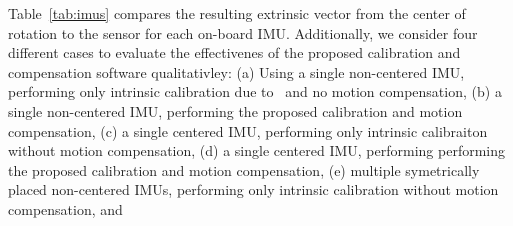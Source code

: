 \documentclass[journal]{IEEEtran}
\begin{document}
\begin{table}[]
  \caption{Comparison of IMU positions obtained from the CAD model and the proposed calibration.}\label{tab:imus}
  \centering
\end{table}
Table~\ref{tab:imus} compares the resulting extrinsic vector from the center of rotation to the sensor for each on-board IMU.
Additionally, we consider four different cases to evaluate the effectivenes of the proposed calibration and compensation software qualitativley:
(a) Using a single non-centered IMU, performing only intrinsic calibration due to~\cite{imutk2014} and no motion compensation, 
(b) a single non-centered IMU, performing the proposed calibration and motion compensation, 
(c) a single centered IMU, performing only intrinsic calibraiton without motion compensation,
(d) a single centered IMU, performing performing the proposed calibration and motion compensation,
(e) multiple symetrically placed non-centered IMUs, performing only intrinsic calibration without motion compensation, and
\end{document}
